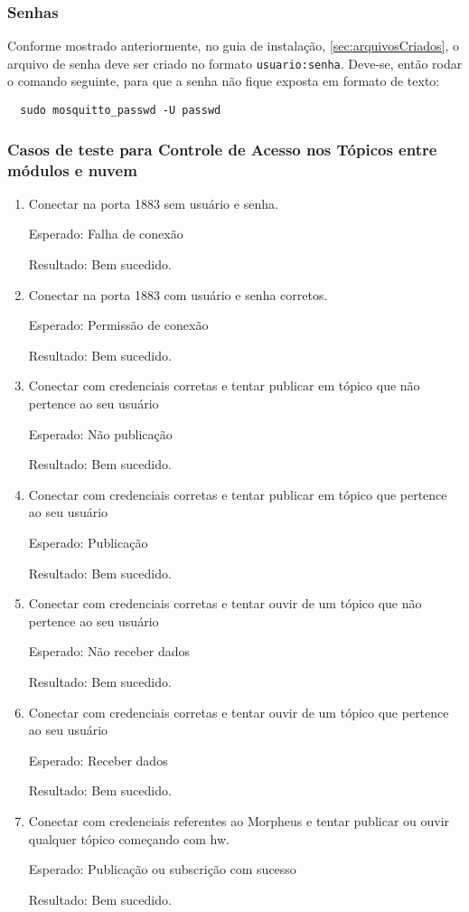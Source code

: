 \subsubsection{Senhas}

Conforme mostrado anteriormente, no guia de instalação, \ref{sec:arquivosCriados}, o arquivo de senha deve ser criado no formato \lstinline{usuario:senha}. Deve-se, então rodar o comando seguinte, para que a senha não fique exposta em formato de texto:

\begin{lstlisting}
  sudo mosquitto_passwd -U passwd
\end{lstlisting}

\subsubsection{Casos de teste para Controle de Acesso nos Tópicos \wmqtt{} entre módulos e nuvem}
\begin{enumerate}
\item
Conectar na porta 1883 sem usuário e senha.

Esperado: Falha de conexão

Resultado: Bem sucedido.
\item Conectar na porta 1883 com usuário e senha corretos.

Esperado: Permissão de conexão

Resultado: Bem sucedido.
\item
Conectar com credenciais corretas e tentar publicar em tópico que não pertence ao seu usuário

Esperado: Não publicação

Resultado: Bem sucedido.
\item
Conectar com credenciais corretas e tentar publicar em tópico que pertence ao seu usuário

Esperado: Publicação

Resultado: Bem sucedido.
\item
Conectar com credenciais corretas e tentar ouvir de um tópico que não pertence ao seu usuário

Esperado: Não receber dados

Resultado: Bem sucedido.
\item
Conectar com credenciais corretas e tentar ouvir de um tópico que pertence ao seu usuário

Esperado: Receber dados

Resultado: Bem sucedido.

\item
Conectar com credenciais referentes ao Morpheus e tentar publicar ou ouvir qualquer tópico começando com hw.

Esperado: Publicação ou subscrição com sucesso

Resultado: Bem sucedido.
\end{enumerate}

